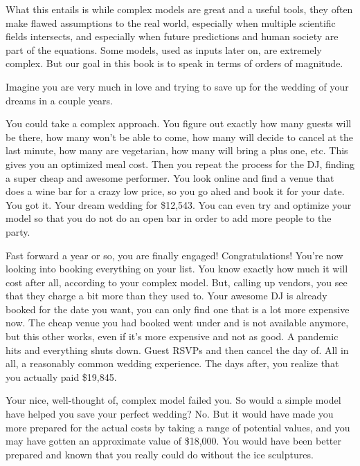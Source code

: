 What this entails is while complex models are great and a useful tools, they often make flawed assumptions to the real world, especially when multiple scientific fields intersects, and especially when future predictions and human society are part of the equations. Some models, used as inputs later on, are extremely complex. But our goal in this book is to speak in terms of orders of magnitude.

Imagine you are very much in love and trying to save up for the wedding of your dreams in a couple years.

You could take a complex approach. You figure out exactly how many guests will be there, how many won't be able to come, how many will decide to cancel at the last minute, how many are vegetarian, how many will bring a plus one, etc. This gives you an optimized meal cost. Then you repeat the process for the DJ, finding a super cheap and awesome performer. You look online and find a venue that does a wine bar for a crazy low price, so you go ahed and book it for your date. You got it. Your dream wedding for \$12,543. You can even try and optimize your model so that you do not do an open bar in order to add more people to the party.

Fast forward a year or so, you are finally engaged! Congratulations! You're now looking into booking everything on your list. You know exactly how much it will cost after all, according to your complex model. But, calling up vendors, you see that they charge a bit more than they used to. Your awesome DJ is already booked for the date you want, you can only find one that is a lot more expensive now. The cheap venue you had booked went under and is not available anymore, but this other works, even if it's more expensive and not as good. A pandemic hits and everything shuts down. Guest RSVPs and then cancel the day of. All in all, a reasonably common wedding experience. The days after, you realize that you actually paid \$19,845.

Your nice, well-thought of, complex model failed you. So would a simple model have helped you save your perfect wedding? No. But it would have made you more prepared for the actual costs by taking a range of potential values, and you may have gotten an approximate value of \$18,000. You would have been better prepared and known that you really could do without the ice sculptures.

